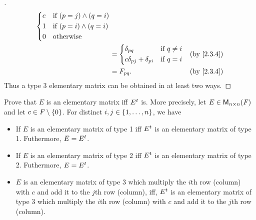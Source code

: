 \begin{proof}[]
\begin{align*}
\begin{dcases}
			                                                c & \text{if } (p = j) \land (q = i)    \\
			                                                1 & \text{if } (p = i) \land (q = i)    \\
			                                                0 & \text{otherwise}
		                                                \end{dcases}                              \\
		                                            & = \begin{dcases}
			                                                \delta_{p q}                  & \text{if } q \neq i \\
			                                                c \delta_{p j} + \delta_{p i} & \text{if } q = i
		                                                \end{dcases} &  & \by{2.3.4}                  \\
		                                            & = F_{p q}.                                             &  & \by{2.3.4}
	\end{align*}
	Thus a type 3 elementary matrix can be obtained in at least two ways.
\end{proof}

\begin{ex}\label{ex:3.1.5}
	Prove that \(E\) is an elementary matrix iff \({E}^{t}\) is.
	More precisely, let \(E \in \mathsf{M}_{{n} \times n}({\mathit{F}})\) and let \(c \in \mathit{F} \setminus \left\lbrace0\right\rbrace\).
	For distinct \(i, j \in \left\lbrace1, \dots, n\right\rbrace\), we have
	\begin{itemize}
		\item If \(E\) is an elementary matrix of type 1 iff \({E}^{t}\) is an elementary matrix of type 1.
		      Futhermore, \(E = {E}^{t}\).
		\item If \(E\) is an elementary matrix of type 2 iff \({E}^{t}\) is an elementary matrix of type 2.
		      Futhermore, \(E = {E}^{t}\).
		\item \(E\) is an elementary matrix of type 3 which multiply the \(i\)th row (column) with \(c\) and add it to the \(j\)th row (column), iff, \({E}^{t}\) is an elementary matrix of type 3 which multiply the \(i\)th row (column) with \(c\) and add it to the \(j\)th row (column).
	\end{itemize}
\end{ex}

